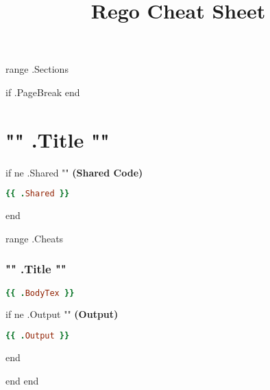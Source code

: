 \documentclass[twocolumn]{article}
\makeatletter
\renewcommand{\maketitle}{\bgroup\setlength{\parindent}{0pt}
\textbf{\LARGE{\@title}}
}
\makeatother
\begin{document}
\pagestyle{logo}
\title{Rego Cheat Sheet}

\maketitle
\vspace{-1em}

{{ range .Sections }}

{{ if .PageBreak }}
\pagebreak
{{ end}}

\section*{{ "{" }}{{ .Title }}{{ "}" }}

{{ if ne .Shared "" }}
\textbf{\tiny{(Shared Code)}}
\begin{lstlisting}[language=Ruby]
{{ .Shared }}
\end{lstlisting}
{{ end }}

{{ range .Cheats }}
\vspace{-1em}
\subsubsection*{{ "{" }}{{ .Title }}{{ "}" }}

\begin{lstlisting}[language=Ruby]
{{ .BodyTex }}
\end{lstlisting}


{{ if ne .Output "" }}
\textbf{\tiny{(Output)}}
\begin{lstlisting}[language=Ruby]
{{ .Output }}
\end{lstlisting}
{{ end }}

{{ end }}
{{ end }}
\end{document}
